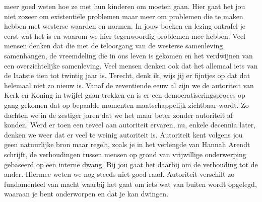 \documentclass[]{book}
\begin{document}
meer goed weten hoe ze met hun kinderen om moeten gaan. Hier gaat het
jou niet zozeer om existentiële problemen maar meer om problemen die te
maken hebben met westerse waarden en normen. In jouw boeken en lezing
ontrafel je eerst wat het is en waarom we hier tegenwoordig problemen
mee hebben. Veel mensen denken dat die met de teloorgang van de westerse
samenleving samenhangen, de vreemdeling die in ons leven is gekomen en
het verdwijnen van een overzichtelijke samenleving. Veel mensen denken
ook dat het allemaal iets van de laatste tien tot twintig jaar is.
Terecht, denk ik, wijs jij er fijntjes op dat dat helemaal niet zo nieuw
is. Vanaf de zeventiende eeuw al zijn we de autoriteit van Kerk en
Koning in twijfel gaan trekken en is er een democratiseringsproces op
gang gekomen dat op bepaalde momenten maatschappelijk zichtbaar wordt.
Zo dachten we in de zestiger jaren dat we het maar beter zonder
autoriteit af konden. Werd er toen een teveel aan autoriteit ervaren,
nu, enkele decennia later, denken we weer dat er veel te weinig
autoriteit is. Autoriteit kent volgens jou geen natuurlijke bron maar
regelt, zoals je in het verlengde van Hannah Arendt schrijft, de
verhoudingen tussen mensen op grond van vrijwillige onderwerping
gebaseerd op een interne dwang. Bij jou gaat het daarbij om de
verhouding tot de ander. Hiermee weten we nog steeds niet goed raad.
Autoriteit verschilt zo fundamenteel van macht waarbij het gaat om iets
wat van buiten wordt opgelegd, waaraan je bent onderworpen en dat je kan
dwingen.
\end{document}
